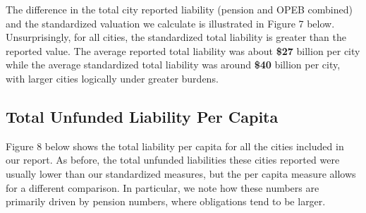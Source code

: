 \documentclass[12pt]{article}
\begin{document}
The difference in the total city reported liability (pension and OPEB
combined) and the standardized valuation we calculate is illustrated in
Figure 7 below. Unsurprisingly, for all cities, the standardized total
liability is greater than the reported value. The average reported total
liability was about \textbf{\$27} billion per city while the average
standardized total liability was around \textbf{\$40} billion per city,
with larger cities logically under greater burdens.

\begin{figure}
  \label{fig:key}
\end{figure}


\subsection{Total Unfunded Liability Per
Capita}

Figure 8 below shows the total liability per capita for all the cities
included in our report. As before, the total unfunded liabilities these
cities reported were usually lower than our standardized measures, but
the per capita measure allows for a different comparison. In particular,
we note how these numbers are primarily driven by pension numbers, where
obligations tend to be larger.
\end{document}
